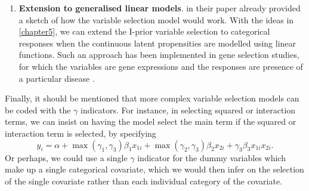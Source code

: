 \documentclass[11pt,twoside,openright]{report}
\begin{document}
\begin{enumerate}
  \item \textbf{Extension to generalised linear models}.
  \citet{Kuo1998} in their paper already provided a sketch of how the variable selection model would work.
  With the ideas in \cref{chapter5}, we can extend the I-prior variable selection to categorical responses when the continuous latent propensities are modelled using linear functions.
  Such an approach has been implemented in gene selection studies, for which the variables are gene expressions and the responses are presence of a particular disease \citep{lee2003gene}.
\end{enumerate}

Finally, it should be mentioned that more complex variable selection models can be coded with the $\gamma$ indicators.
For instance, in selecting squared or interaction terms, we can insist on having the model select the main term if the squared or interaction term is selected, by specifying
\vspace{-1mm}
\[
  y_i = \alpha + \max(\gamma_1 ,\gamma_3) \beta_1 x_{1i} + \max(\gamma_2 ,\gamma_3) \beta_2 x_{2i} + \gamma_3 \beta_3 x_{1i}x_{2i}.
\]
\vspace{-1mm}
Or perhaps, we could use a single $\gamma$ indicator for the dummy variables which make up a single categorical covariate, which we would then infer on the selection of the single covariate rather than each individual category of the covariate.

\hClosingStuffStandalone
\end{document}
